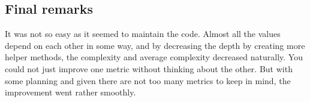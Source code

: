 \documentclass[UKenglish]{article}  %
\begin{document}
\subsection{Final remarks}
It was not so easy as it seemed to maintain the code. Almost all the values
depend on each other in some way, and by decreasing the depth by creating more
helper methods, the complexity and average complexity decreased naturally. You
could not just improve one metric without thinking about the other. But with
some planning and given there are not too many metrics to keep in mind, the
improvement went rather smoothly. 
\end{document}
